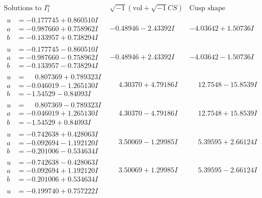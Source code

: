 \documentclass[1p]{elsarticle_modified}
\theoremstyle{definition}
\newcommand{\I}{\sqrt{-1}}
\begin{document}
$$\begin{array}{c|c|c}  
\text{Solutions to }I^u_{1}& \I (\text{vol} + \sqrt{-1}CS) & \text{Cusp shape}\\
 \hline 
\begin{aligned}
u &= -0.177745 + 0.860510 I \\
a &= -0.987660 + 0.758962 I \\
b &= -0.133957 + 0.738294 I\end{aligned}
 & -0.48946 - 2.43392 I & -4.03642 + 1.50736 I \\ \hline\begin{aligned}
u &= -0.177745 - 0.860510 I \\
a &= -0.987660 - 0.758962 I \\
b &= -0.133957 - 0.738294 I\end{aligned}
 & -0.48946 + 2.43392 I & -4.03642 - 1.50736 I \\ \hline\begin{aligned}
u &= \phantom{-}0.807369 + 0.789323 I \\
a &= -0.046019 - 1.265130 I \\
b &= -1.54529 - 0.84093 I\end{aligned}
 & \phantom{-}4.30370 + 4.79186 I & \phantom{-}12.7548 - 15.8539 I \\ \hline\begin{aligned}
u &= \phantom{-}0.807369 - 0.789323 I \\
a &= -0.046019 + 1.265130 I \\
b &= -1.54529 + 0.84093 I\end{aligned}
 & \phantom{-}4.30370 - 4.79186 I & \phantom{-}12.7548 + 15.8539 I \\ \hline\begin{aligned}
u &= -0.742638 + 0.428063 I \\
a &= -0.092694 - 1.192120 I \\
b &= -0.201006 - 0.534634 I\end{aligned}
 & \phantom{-}3.50069 - 1.29985 I & \phantom{-}5.39595 + 2.66124 I \\ \hline\begin{aligned}
u &= -0.742638 - 0.428063 I \\
a &= -0.092694 + 1.192120 I \\
b &= -0.201006 + 0.534634 I\end{aligned}
 & \phantom{-}3.50069 + 1.29985 I & \phantom{-}5.39595 - 2.66124 I \\ \hline\begin{aligned}
u &= -0.199740 + 0.757222 I \\

\end{aligned}
\end{array}$$
\end{document}
